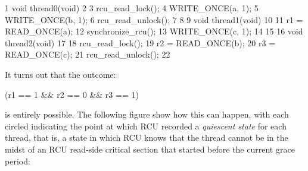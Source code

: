 \begin{VerbatimN}
       1 void thread0(void)
       2 {
       3   rcu_read_lock();
       4   WRITE_ONCE(a, 1);
       5   WRITE_ONCE(b, 1);
       6   rcu_read_unlock();
       7 }
       8
       9 void thread1(void)
      10 {
      11   r1 = READ_ONCE(a);
      12   synchronize_rcu();
      13   WRITE_ONCE(c, 1);
      14 }
      15
      16 void thread2(void)
      17 {
      18   rcu_read_lock();
      19   r2 = READ_ONCE(b);
      20   r3 = READ_ONCE(c);
      21   rcu_read_unlock();
      22 }
\end{VerbatimN}

It turns out that the outcome:

\begin{VerbatimU}
      (r1 == 1 && r2 == 0 && r3 == 1)
\end{VerbatimU}

\noindent%
is entirely possible.
The following figure show how this can happen,
with each circled  indicating the point at which RCU recorded a
\emph{quiescent state} for each thread, that is, a state in which RCU knows
that the thread cannot be in the midst of an RCU read-side critical
section that started before the current grace period:

\begin{center}
\end{center}

